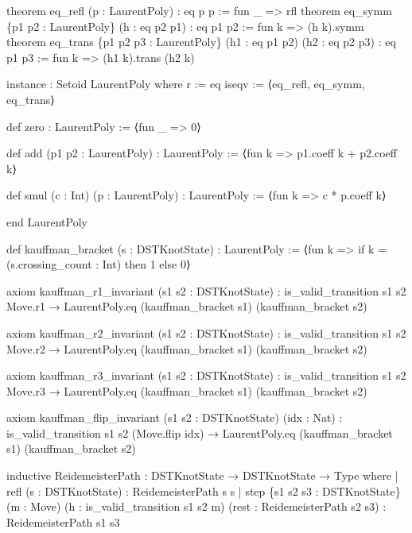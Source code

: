 \documentclass{article}
\newenvironment{Shaded}{%
  \begin{snugshade}%
}{%
  \end{snugshade}%
}%
\newenvironment{Highlighting}{%
}{%
}%
\newcommand{\NormalTok}[1]{#1}
\begin{document}
\begin{Shaded}
\begin{Highlighting}[]
\NormalTok{theorem eq\_refl (p : LaurentPoly) : eq p p := fun \_ =\textgreater{} rfl}
\NormalTok{theorem eq\_symm \{p1 p2 : LaurentPoly\} (h : eq p2 p1) : eq p1 p2 := fun k =\textgreater{} (h k).symm}
\NormalTok{theorem eq\_trans \{p1 p2 p3 : LaurentPoly\} (h1 : eq p1 p2) (h2 : eq p2 p3) : eq p1 p3 :=}
\NormalTok{  fun k =\textgreater{} (h1 k).trans (h2 k)}

\NormalTok{instance : Setoid LaurentPoly where}
\NormalTok{  r := eq}
\NormalTok{  iseqv := ⟨eq\_refl, eq\_symm, eq\_trans⟩}

\NormalTok{def zero : LaurentPoly := ⟨fun \_ =\textgreater{} 0⟩}

\NormalTok{def add (p1 p2 : LaurentPoly) : LaurentPoly :=}
\NormalTok{  ⟨fun k =\textgreater{} p1.coeff k + p2.coeff k⟩}

\NormalTok{def smul (c : Int) (p : LaurentPoly) : LaurentPoly :=}
\NormalTok{  ⟨fun k =\textgreater{} c * p.coeff k⟩}

\NormalTok{end LaurentPoly}

\NormalTok{def kauffman\_bracket (s : DSTKnotState) : LaurentPoly :=}
\NormalTok{  ⟨fun k =\textgreater{} if k = (s.crossing\_count : Int) then 1 else 0⟩}

\NormalTok{axiom kauffman\_r1\_invariant (s1 s2 : DSTKnotState) :}
\NormalTok{  is\_valid\_transition s1 s2 Move.r1 → LaurentPoly.eq (kauffman\_bracket s1) (kauffman\_bracket s2)}

\NormalTok{axiom kauffman\_r2\_invariant (s1 s2 : DSTKnotState) :}
\NormalTok{  is\_valid\_transition s1 s2 Move.r2 → LaurentPoly.eq (kauffman\_bracket s1) (kauffman\_bracket s2)}

\NormalTok{axiom kauffman\_r3\_invariant (s1 s2 : DSTKnotState) :}
\NormalTok{  is\_valid\_transition s1 s2 Move.r3 → LaurentPoly.eq (kauffman\_bracket s1) (kauffman\_bracket s2)}

\NormalTok{axiom kauffman\_flip\_invariant (s1 s2 : DSTKnotState) (idx : Nat) :}
\NormalTok{  is\_valid\_transition s1 s2 (Move.flip idx) → LaurentPoly.eq (kauffman\_bracket s1) (kauffman\_bracket s2)}

\NormalTok{inductive ReidemeisterPath : DSTKnotState → DSTKnotState → Type where}
\NormalTok{  | refl (s : DSTKnotState) : ReidemeisterPath s s}
\NormalTok{  | step \{s1 s2 s3 : DSTKnotState\} (m : Move) (h : is\_valid\_transition s1 s2 m)}
\NormalTok{         (rest : ReidemeisterPath s2 s3) : ReidemeisterPath s1 s3}


\end{Highlighting}
\end{Shaded}
\end{document}
